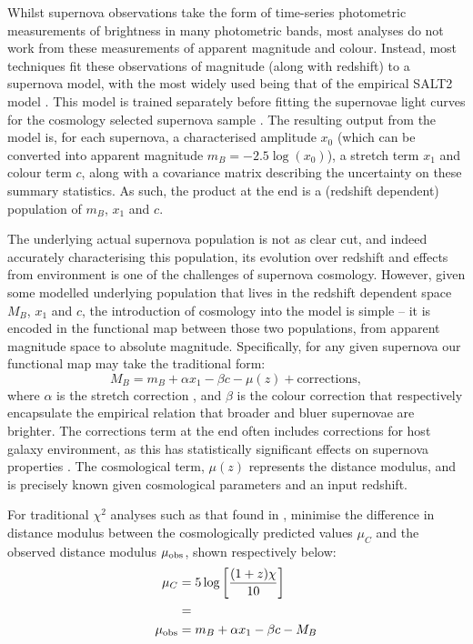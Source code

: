 \documentclass[a4paper,fleqn,usenatbib]{mnras}
\begin{document}
Whilst supernova observations take the form of time-series photometric measurements of brightness in many photometric bands, most analyses do not work from these measurements of apparent magnitude and colour. Instead, most techniques fit these observations of magnitude (along with redshift) to a supernova model, with the most widely used being that of the empirical SALT2 model \citep{Guy2007, Guy2010}. This model is trained separately before fitting the supernovae light curves for the cosmology selected supernova sample \citep{Guy2010, Mosher2014}. The resulting output from the model is, for each supernova, a characterised amplitude $x_0$ (which can be converted into apparent magnitude $m_B = -2.5\log(x_0)$), a stretch term $x_1$ and colour term $c$, along with a covariance matrix describing the uncertainty on these summary statistics. As such, the product at the end is a (redshift dependent) population of $m_B$, $x_1$ and $c$.

The underlying actual supernova population is not as clear cut, and indeed accurately characterising this population, its evolution over redshift and effects from environment is one of the challenges of supernova cosmology. However, given some modelled underlying population that lives in the redshift dependent space $M_B$, $x_1$ and $c$, the introduction of cosmology into the model is simple -- it is encoded in the functional map between those two populations, from apparent magnitude space to absolute magnitude. Specifically, for any given supernova our functional map may take the traditional form:
\begin{equation}
M_B = m_B + \alpha x_1 - \beta c - \mu(z) + \text{corrections},
\end{equation}
where $\alpha$ is the stretch correction \citep{Phillips1993}, and $\beta$ is the colour correction \citep{Tripp1998} that respectively encapsulate the empirical relation that broader and bluer supernovae are brighter. The $\text{corrections}$ term at the end often includes corrections for host galaxy environment, as this has statistically significant effects on supernova properties \citep{Kelly2010, Lampeitl2010, Sullivan2010, Rigault2013, Uddin2017}. The cosmological term, $\mu(z)$ represents the distance modulus, and is precisely known given cosmological parameters and an input redshift.


For traditional $\chi^2$ analyses such as that found in \citet{Kowalski2008, Conley2011, Betoule2014}, minimise the difference in distance modulus between the cosmologically predicted values $\mu_C$ and the observed distance modulus $\mu_{\rm obs}$, shown respectively below:
\begin{align}
\mu_C &= 5 \log\left[ \frac{(1+z)\chi}{10} \right]\\
&=\\
\mu_{\rm obs} &= m_B + \alpha x_1 - \beta c - M_B
\end{align}
\end{document}
